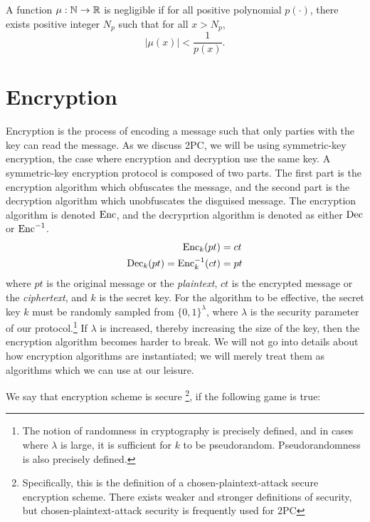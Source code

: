 \begin{definition}
\label{defn:negible}
A function $\mu : \mathbb{N} \to \mathbb{R}$ is negligible if for all positive polynomial $p(\cdot)$, there exists positive integer $N_p$ such that for all $x > N_p$, 
\begin{equation}
    |\mu(x)| < \frac{1}{p(x)}.
\end{equation}
\cite{goldreich}
\end{definition}

\section{Encryption}
Encryption is the process of encoding a message such that only parties with the key can read the message.
As we discuss 2PC, we will be using symmetric-key encryption, the case where encryption and decryption use the same key.
A symmetric-key encryption protocol is composed of two parts.
The first part is the encryption algorithm which obfuscates the message, and the second part is the decryption algorithm which unobfuscates the disguised message.
The encryption algorithm is denoted $\operatorname{Enc}$, and the decryprtion algorithm is denoted as either $\operatorname{Dec}$ or $\operatorname{Enc}^{-1}$.
\begin{equation}
    \label{eqn:encryption}
    \begin{split}
        \operatorname{Enc}_k (pt) & = ct  \\
        \operatorname{Dec}_k(pt) = \operatorname{Enc}^{-1}_k(ct) & = pt
    \end{split}
\end{equation}
where $pt$ is the original message or the \emph{plaintext}, $ct$ is the encrypted message or the \emph{ciphertext}, and $k$ is the secret key.
For the algorithm to be effective, the secret key $k$ must be randomly sampled from $\{0,1\}^\lambda$, where $\lambda$ is the security parameter of our protocol.\footnote{The notion of randomness in cryptography is precisely defined, and in cases where $\lambda$ is large, it is sufficient for $k$ to be pseudorandom. Pseudorandomness is also precisely defined.}
If  $\lambda$ is increased, thereby increasing the size of the key, then the encryption algorithm becomes harder to break.
We will not go into details about how encryption algorithms are instantiated; we will merely treat them as algorithms which we can use at our leisure.

We say that encryption scheme is secure \footnote{Specifically, this is the definition of a chosen-plaintext-attack secure encryption scheme. There exists weaker and stronger definitions of security, but chosen-plaintext-attack security is frequently used for 2PC}, if the following game is true:


